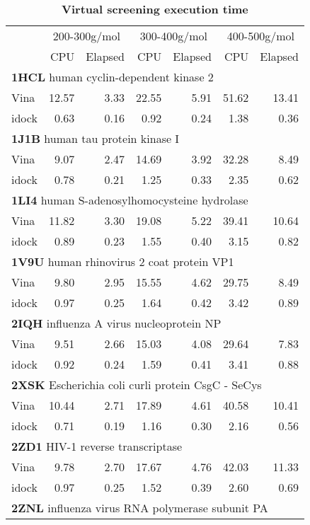 \documentclass[10pt]{article}
\begin{document}
\begin{table}[!ht]
\caption{
\bf{Virtual screening execution time}}
\begin{tabular}{lrrrrrr}
\hline
& \multicolumn{2}{c}{200-300g/mol} & \multicolumn{2}{c}{300-400g/mol} & \multicolumn{2}{c}{400-500g/mol}\\
& CPU & Elapsed & CPU & Elapsed & CPU & Elapsed\\
\hline
\multicolumn{7}{l}{\textbf{1HCL} human cyclin-dependent kinase 2}\\
Vina  & 12.57 &  3.33 & 22.55 &  5.91 & 51.62 & 13.41\\
idock &  0.63 &  0.16 &  0.92 &  0.24 &  1.38 &  0.36\\
\multicolumn{7}{l}{\textbf{1J1B} human tau protein kinase I}\\
Vina  &  9.07 &  2.47 & 14.69 &  3.92 & 32.28 &  8.49\\
idock &  0.78 &  0.21 &  1.25 &  0.33 &  2.35 &  0.62\\
\multicolumn{7}{l}{\textbf{1LI4} human S-adenosylhomocysteine hydrolase}\\
Vina  & 11.82 &  3.30 & 19.08 &  5.22 & 39.41 & 10.64\\
idock &  0.89 &  0.23 &  1.55 &  0.40 &  3.15 &  0.82\\
\multicolumn{7}{l}{\textbf{1V9U} human rhinovirus 2 coat protein VP1}\\
Vina  &  9.80 &  2.95 & 15.55 &  4.62 & 29.75 &  8.49\\
idock &  0.97 &  0.25 &  1.64 &  0.42 &  3.42 &  0.89\\
\multicolumn{7}{l}{\textbf{2IQH} influenza A virus nucleoprotein NP}\\
Vina  &  9.51 &  2.66 & 15.03 &  4.08 & 29.64 &  7.83\\
idock &  0.92 &  0.24 &  1.59 &  0.41 &  3.41 &  0.88\\
\multicolumn{7}{l}{\textbf{2XSK} Escherichia coli curli protein CsgC - SeCys}\\
Vina  & 10.44 &  2.71 & 17.89 &  4.61 & 40.58 & 10.41\\
idock &  0.71 &  0.19 &  1.16 &  0.30 &  2.16 &  0.56\\
\multicolumn{7}{l}{\textbf{2ZD1} HIV-1 reverse transcriptase}\\
Vina  &  9.78 &  2.70 & 17.67 &  4.76 & 42.03 & 11.33\\
idock &  0.97 &  0.25 &  1.52 &  0.39 &  2.60 &  0.69\\
\multicolumn{7}{l}{\textbf{2ZNL} influenza virus RNA polymerase subunit PA}\\

\end{tabular}
\end{table}
\end{document}
